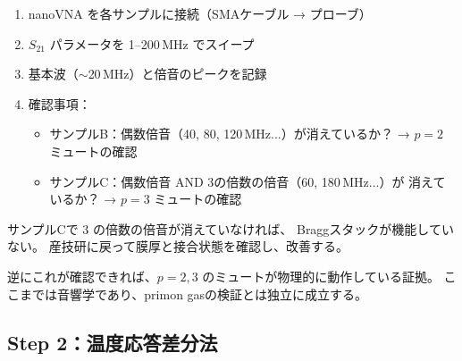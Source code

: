 \documentclass[11pt,a4paper]{article}
\def\textbf#1{#1}%
\begin{document}
\begin{enumerate}[leftmargin=*]
\item nanoVNA を各サンプルに接続（SMAケーブル → プローブ）
\item $S_{21}$ パラメータを 1--200\,MHz でスイープ
\item 基本波（$\sim$20\,MHz）と倍音のピークを記録
\item \textbf{確認事項}：
  \begin{itemize}
  \item サンプルB：偶数倍音（40, 80, 120\,MHz...）が消えているか？
    → $p = 2$ ミュートの確認
  \item サンプルC：偶数倍音 AND 3の倍数の倍音（60, 180\,MHz...）が
    消えているか？ → $p = 3$ ミュートの確認
  \end{itemize}
\end{enumerate}

\begin{tcolorbox}[colback=green!5,colframe=green!60!black,title=最初のチェックポイント]
サンプルCで 3 の倍数の倍音が消えていなければ、
Braggスタックが機能していない。
産技研に戻って膜厚と接合状態を確認し、改善する。

逆にこれが確認できれば、$p = 2, 3$ のミュートが物理的に動作している証拠。
ここまでは音響学であり、primon gasの検証とは独立に成立する。
\end{tcolorbox}

\subsection{Step 2：温度応答差分法}
\end{document}
